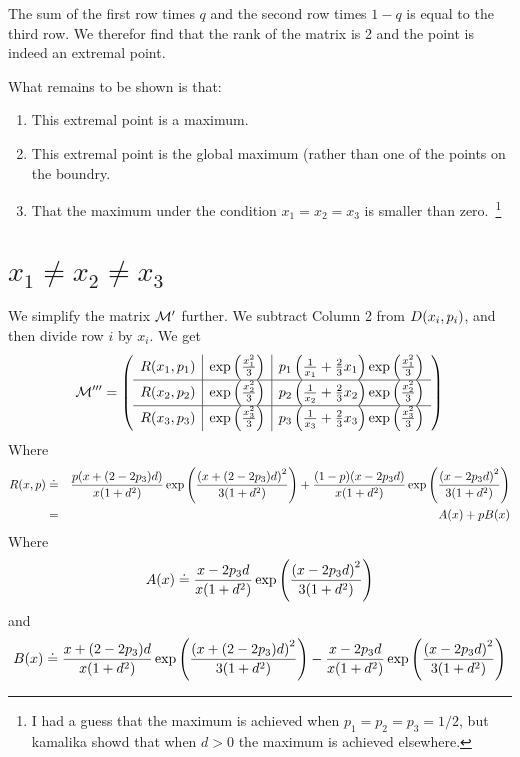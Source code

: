\documentclass{article}[12pt]
\theoremstyle{plain}
\begin{document}
The sum of the first row times $q$ and the second row times $1-q$ is
equal to the third row. We therefor find that the rank of the matrix
is 2 and the point is indeed an extremal point.

What remains to be shown is that:
\begin{enumerate}
\item This extremal point is a maximum.
\item This extremal point is the global maximum (rather than one of
  the points on the boundry.
\item That the maximum under the condition $x_1=x_2=x_3$ is smaller
  than zero.~\footnote{I had a guess that the maximum is achieved when
    $p_1=p_2=p_3=1/2$, but kamalika showd that when $d>0$ the maximum
    is achieved elsewhere.}
\end{enumerate}


\section{$x_1 \neq x_2 \neq x_3$}
We simplify the matrix $\Mlag'$ further. We subtract Column 2 from
$\dT{x_i,p_i}$, and then divide row $i$ by $x_i$.
We get
\[\Mlag''' =
\paren{
\begin{array}{c|c|c}
\dR{x_1,p_1} & \potExpr{x_1}{} &
\thirdColSimp{x_1}{p_1} \\
\hline
\dR{x_2,p_2} & \potExpr{x_2}{} &
\thirdColSimp{x_2}{p_2} \\
\hline
\dR{x_3,p_3} & \potExpr{x_3}{} &
\thirdColSimp{x_3}{p_3}
\end{array}
}
\]
Where
\begin{eqnarray*}
\dR{x,p} &\doteq& 
\frac{p(x+(2-2p_3)d)}{x(1+d^2)}\exp\paren{\frac{\paren{x+(2-2p_3)d}^2}{3(1+d^2)}}
+
\frac{(1-p)(x-2p_3d)}{x(1+d^2)}\exp\paren{\frac{\paren{x-2p_3d}^2}{3(1+d^2)}}
\\
&=& \dA{x} + p \dB{x}
\end{eqnarray*}
Where
\[
\dA{x} \doteq 
\frac{x-2p_3d}{x(1+d^2)}\exp\paren{\frac{\paren{x-2p_3d}^2}{3(1+d^2)}}
\]
and
\[
\dB{x} \doteq 
\frac{x+(2-2p_3)d}{x(1+d^2)}\exp\paren{\frac{\paren{x+(2-2p_3)d}^2}{3(1+d^2)}}
- \frac{x-2p_3d}{x(1+d^2)}\exp\paren{\frac{\paren{x-2p_3d}^2}{3(1+d^2)}}
\]
\end{document}
